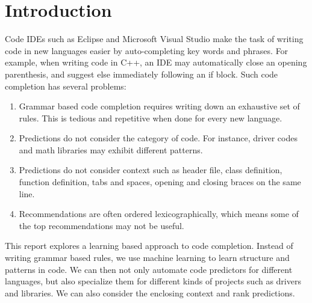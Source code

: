 \section{Introduction}
\label{sec:intro}

\noindent
Code IDEs such as Eclipse and Microsoft Visual Studio make the task of writing
code in new languages easier by auto-completing key words and phrases.
For example, when writing code in C++, an IDE may automatically close an
opening parenthesis, and suggest else immediately following an if block.
Such code completion has several problems:
\begin{enumerate}[topsep=0pt,itemsep=-1ex,partopsep=1ex,parsep=1ex]
  \item Grammar based code completion requires writing down an exhaustive set
    of rules. This is tedious and repetitive when done for every new language.
  \item Predictions do not consider the category of code. For instance, driver
    codes and math libraries may exhibit different patterns.
  \item Predictions do not consider context such as header file, class
    definition, function definition, tabs and spaces, opening and closing
    braces on the same line.
  \item Recommendations are often ordered lexicographically, which means some
    of the top recommendations may not be useful.
\end{enumerate}

\noindent
This report explores a learning based approach to code completion. Instead of
writing grammar based rules, we use machine learning to learn structure and
patterns in code. We can then not only automate code predictors for different
languages, but also specialize them for different kinds of projects such as
drivers and libraries. We can also consider the enclosing context and rank
predictions.
